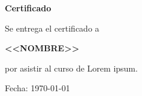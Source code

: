 \documentclass[12pt]{article}
\begin{document}
\begin{center}
\vspace*{3cm}
\Huge \textbf{Certificado}

\vspace{2cm}
\Large Se entrega el certificado a

\vspace{1cm}
\Huge \textbf{<<NOMBRE>>}

\vspace{1cm}
\Large por asistir al curso de Lorem ipsum.

\vfill
\large Fecha: \today
\end{center}
\end{document}
